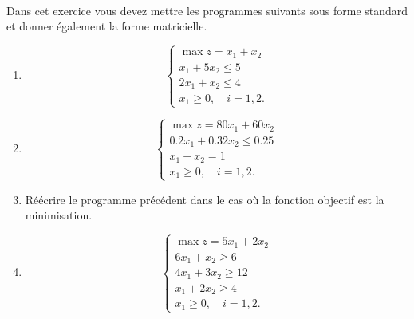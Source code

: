 \begin{td-exo}\,\\ %
	Dans cet exercice vous devez mettre les programmes suivants sous forme standard et donner
	également la forme matricielle.
	\begin{enumerate}
		\item
		\begin{equation*}
			\begin{cases}
				\max z = x_1 + x_2 \\
				x_1 + 5 x_2 \leq 5 \\
				2x_1 + x_2 \leq 4 \\
				x_1 \geq 0,\quad i=1,2.
			\end{cases}
		\end{equation*}

		\item
		\begin{equation*}
			\begin{cases}
				\max z = 80 x_1 + 60 x_2 \\
				0.2x_1 + 0.32 x_2 \leq 0.25\\
				x_1 + x_2 = 1 \\
				x_1 \geq 0,\quad i=1,2.
			\end{cases}
		\end{equation*}

		\item Réécrire le programme précédent dans le cas où la fonction objectif
		est la minimisation.

		\item
		\begin{equation*}
			\begin{cases}
				\max z = 5x_1 + 2x_2 \\
				6x_1 + x_2 \geq 6 \\
				4x_1 + 3x_2  \geq 12 \\
				x_1 + 2x_2 \geq 4 \\
				x_1 \geq 0,\quad i=1,2.
			\end{cases}
		\end{equation*}
	\end{enumerate}
\end{td-exo}

